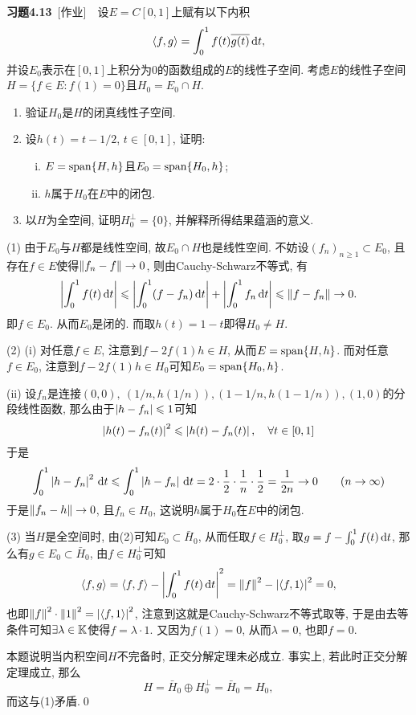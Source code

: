 	\textbf{习题4.13}\ [作业]\ \ 设$ E=C[0,1] $上赋有以下内积
	\[
	\left\langle f,g \right\rangle=\int_0^1f(t)\overline{g(t)}\,\mathrm{d} t,
	\]
	并设$ E_0 $表示在$ [0,1] $上积分为0的函数组成的$ E $的线性子空间. 考虑$ E $的线性子空间$ H=\{ f\in E : f(1)=0 \} $且$ H_0=E_0\cap H $.
	\begin{enumerate}[(1)]
	\item 验证$ H_0 $是$ H $的闭真线性子空间.
	\item 设$ h(t)=t-1/2 $, $ t\in[0,1] $, 证明:
	\begin{enumerate}[(i)]
	\item $ E=\operatorname{span}\{H,h\} $且$ E_0=\operatorname{span}\{H_0,h\} $;
	\item $ h $属于$ H_0 $在$ E $中的闭包.
	\end{enumerate}
	\item 以$ H $为全空间, 证明$ H_0^\bot=\{0\} $, 并解释所得结果蕴涵的意义.
	\end{enumerate}
	\begin{Proof}
	(1) 由于$ E_0 $与$ H $都是线性空间, 故$ E_0\cap H $也是线性空间. 不妨设$ (f_n)_{n\geqslant 1}\subset E_0 $, 且存在$ f\in E $使得$ \left\| f_n-f \right\|\to 0 $, 则由Cauchy-Schwarz不等式, 有
	\[
	\left| \int_0^1f(t)\,\mathrm{d} t \right| \leqslant\left| \int_0^1(f-f_n)\,\mathrm{d} t \right| +\left| \int_0^1f_n\,\mathrm{d} t \right| \leqslant\left\| f-f_n \right\|\to 0.
	\]
	即$ f\in E_0 $. 从而$ E_0 $是闭的. 而取$ h(t)=1-t $即得$ H_0\ne H $.
	
	(2) (i) 对任意$ f\in E $, 注意到$ f-2f(1)h\in H $, 从而$ E=\operatorname{span}\{ H,h \} $. 而对任意$ f\in E_0 $, 注意到$ f-2f(1)h\in H_0 $可知$ E_0=\operatorname{span}\{ H_0,h \} $.
	
	(ii) 设$ f_n $是连接$ (0,0),\ (1/n,h(1/n)), (1-1/n,h(1-1/n)), (1,0) $的分段线性函数, 那么由于$ \left| h-f_n \right| \leqslant 1 $可知
	\[
	\left| h(t)-f_n(t) \right| ^2\leqslant\left| h(t)-f_n(t) \right| ,\quad\forall t\in [0,1]
	\]
	于是
	\[
	\int_0^1\left| h-f_n \right| ^2\,\mathrm{d} t\leqslant\int_0^1\left| h-f_n \right| \,\mathrm{d} t=2\cdot\frac{1}{2}\cdot\frac{1}{n}\cdot\frac{1}{2}=\frac{1}{2n}\to 0\qquad (n\to\infty)
	\]
	于是$ \left\| f_n-h \right\|\to 0 $, 且$ f_n\in H_0 $, 这说明$ h $属于$ H_0 $在$ E $中的闭包.
	
	(3) 当$ H $是全空间时, 由(2)可知$ E_0\subset\bar{H}_0 $, 从而任取$ f\in H_0^\bot $, 取$ g=f-\int_0^1f(t)\,\mathrm{d} t $, 那么有$ g\in E_0\subset \bar{H}_0 $, 由$ f\in H_0^\bot $可知
	\[
	\left\langle f,g \right\rangle=\left\langle f,f \right\rangle-\left| \int_0^1f(t)\,\mathrm{d} t \right| ^2=\left\| f \right\|^2-\left| \left\langle f,1 \right\rangle \right| ^2=0,
	\]
	也即$ \left\| f \right\|^2\cdot\left\| 1 \right\|^2=\left| \left\langle f,1 \right\rangle \right| ^2 $, 注意到这就是Cauchy-Schwarz不等式取等, 于是由去等条件可知$ \exists\lambda\in\mathbb{K} $使得$ f=\lambda\cdot 1 $. 又因为$ f(1)=0 $, 从而$ \lambda=0 $, 也即$ f=0 $.
	
	本题说明当内积空间$ H $不完备时, 正交分解定理未必成立. 事实上, 若此时正交分解定理成立, 那么
	\[
	H=\bar{H}_0\oplus H_0^\bot=\bar{H}_0=H_0,
	\]
	而这与(1)矛盾.\qed
	\end{Proof}

